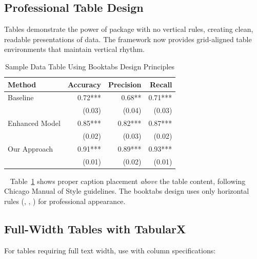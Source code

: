 \documentclass[11pt]{article}
\begin{document}
\subsection{Professional Table Design}

Tables demonstrate the power of  package with no vertical rules, creating clean, readable presentations of data. The framework now provides grid-aligned table environments that maintain vertical rhythm.

\begin{table}[tbp]
  \caption{Sample Data Table Using Booktabs Design Principles}
  \label{tab:sample-data}
  \centering
  \begin{tabular}{@{}lrrr@{}}
    \toprule
    Method & Accuracy & Precision & Recall \\
    \midrule
    Baseline & 0.72*** & 0.68** & 0.71*** \\
                & (0.03) & (0.04) & (0.03) \\
    Enhanced Model & 0.85*** & 0.82*** & 0.87*** \\
                   & (0.02) & (0.03) & (0.02) \\
    Our Approach & 0.91*** & 0.89*** & 0.93*** \\
                 & (0.01) & (0.02) & (0.01) \\
    \bottomrule
  \end{tabular}
  \begin{tablenotes}
    \tabstars
  \end{tablenotes}
\end{table}

~ Table~\ref{tab:sample-data} shows proper caption placement \emph{above} the table content, following Chicago Manual of Style guidelines. The booktabs design uses only horizontal rules (, , ) for professional appearance.

\subsection{Full-Width Tables with TabularX}

For tables requiring full text width, use  with  column specifications:
\end{document}
